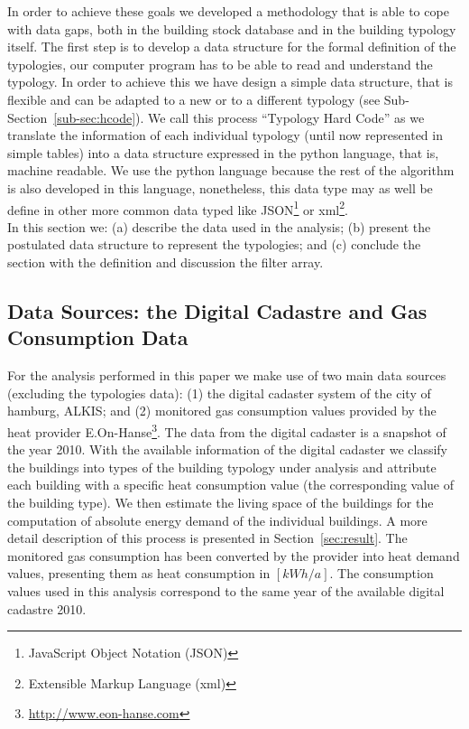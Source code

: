In order to achieve these goals we developed a methodology that is able to
cope with data gaps, both in the building stock database and in the
building typology itself.
%
%
%
The first step is to develop a data structure for the formal definition of the
typologies, our computer program has to be able to read and understand the
typology.  In order to achieve this we have design a simple data structure,
that is flexible and can be adapted to a new or to a different typology (see
Sub-Section~\ref{sub-sec:hcode}).  We call this process ``Typology Hard Code''
as we translate the information of each individual typology (until now
represented in simple tables) into a data structure expressed in the python
language, that is, machine readable.  We use the python language because the
rest of the algorithm is also developed in this language, nonetheless, this
data type may as well be define in other more common data typed like
JSON\footnote{JavaScript Object Notation (JSON)} or xml\footnote{Extensible
Markup Language (xml)}.\\

In this section we: (a) describe the data used in the analysis; (b) present the
postulated data structure to represent the typologies; and (c) conclude the
section with the definition and discussion the filter array.\\

\subsection{Data Sources: the Digital Cadastre and Gas Consumption
Data}\label{sub-sec:data}

For the analysis performed in this paper we make use of two main data sources
(excluding the typologies data): (1) the digital cadaster system of the city of
hamburg, ALKIS; and (2) monitored gas consumption values provided by the heat
provider E.On-Hanse\footnote{\url{http://www.eon-hanse.com}}. The data from
the digital cadaster is a snapshot of the year 2010.  With the available
information of the digital cadaster we classify the buildings into types of the
building typology under analysis and attribute each building with a specific
heat consumption value (the corresponding value of the building type).  We then
estimate the living space of the buildings for the computation of absolute
energy demand of the individual buildings. A more detail description of this
process is presented in Section~\ref{sec:result}. The monitored gas
consumption has been converted by the provider into heat demand values,
presenting them as heat consumption in $[kWh/a]$. The consumption values used
in this analysis correspond to the same year of the available digital cadastre
2010.\\

